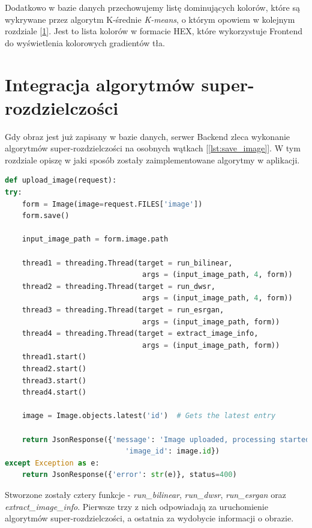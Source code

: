 Dodatkowo w bazie danych przechowujemy listę dominujących kolorów, które są wykrywane przez algorytm K-średnie \textit{K-means}, o którym opowiem w kolejnym rozdziale [\ref{sec:implementation-s-r}]. Jest to lista kolorów w formacie HEX, które wykorzystuje Frontend do wyświetlenia kolorowych gradientów tła.


\newpage
\section{Integracja algorytmów super-rozdzielczości} \label{sec:implementation-s-r}

Gdy obraz jest już zapisany w bazie danych, serwer Backend zleca wykonanie algorytmów super-rozdzielczości na osobnych wątkach [\ref{lst:save_image}]. W tym rozdziale opiszę w jaki sposób zostały zaimplementowane algorytmy w aplikacji.

\begin{lstlisting}[language=Python, caption=Obsługa zapisu i przetwarzania obrazów., label={lst:save_image}]
def upload_image(request):
try:
    form = Image(image=request.FILES['image'])
    form.save()

    input_image_path = form.image.path
    
    thread1 = threading.Thread(target = run_bilinear, 
                                args = (input_image_path, 4, form))
    thread2 = threading.Thread(target = run_dwsr, 
                                args = (input_image_path, 4, form))
    thread3 = threading.Thread(target = run_esrgan, 
                                args = (input_image_path, form))
    thread4 = threading.Thread(target = extract_image_info, 
                                args = (input_image_path, form))
    thread1.start()
    thread2.start()
    thread3.start()
    thread4.start()

    image = Image.objects.latest('id')  # Gets the latest entry

    return JsonResponse({'message': 'Image uploaded, processing started', 
                            'image_id': image.id})
except Exception as e:
    return JsonResponse({'error': str(e)}, status=400)
\end{lstlisting}

Stworzone zostały cztery funkcje - \textit{run\_bilinear}, \textit{run\_dwsr}, \textit{run\_esrgan} oraz\\ \textit{extract\_image\_info}. Pierwsze trzy z nich odpowiadają za uruchomienie algorytmów super-rozdzielczości, a ostatnia za wydobycie informacji o obrazie.




